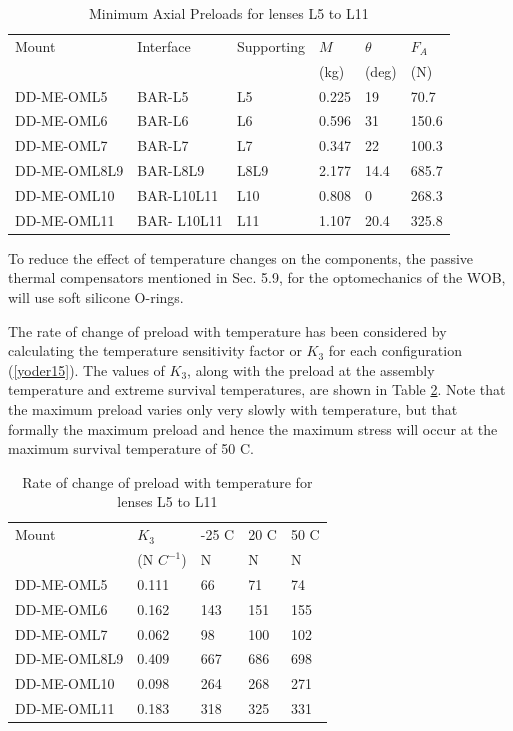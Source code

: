 \documentclass{report}
\begin{document}
\begin{table}
\caption{Minimum Axial Preloads for lenses L5 to L11}
\label{table:preloadsL5L11}
\begin{center}
\small
\begin{tabular}{llllll}
\hline
\hline
Mount	&	Interface	&	Supporting	&	$M$	&	$\theta$	&	$F_A$	\\
	&		&		&	(kg)	&	(deg)	&	(N)	\\
	\hline
DD-ME-OML5	&	BAR-L5	&	L5	&	0.225	&	19	&	70.7	\\
DD-ME-OML6	&	BAR-L6	&	L6	&	0.596	&	31	&	150.6	\\
DD-ME-OML7	&	BAR-L7	&	L7	&	0.347	&	22	&	100.3	\\
DD-ME-OML8L9	&	BAR-L8L9	&	L8L9	&	2.177	&	14.4	&	685.7	\\
DD-ME-OML10	&	BAR-L10L11	&	L10	&	0.808	&	0	&	268.3	\\
DD-ME-OML11	&	BAR- L10L11	&	L11	&	1.107	&	20.4	&	325.8	\\
\hline
\end{tabular}
\end{center}
\end{table}

To reduce the effect of temperature changes on the components, the passive thermal compensators mentioned in Sec. 5.9, for the optomechanics of the WOB, will use soft silicone O-rings.

The rate of change of preload with temperature has been considered by calculating the temperature sensitivity factor or $K_3$ for each configuration (\ref{yoder15}). The values of $K_3$, along with the preload at the assembly temperature and extreme survival temperatures, are shown in Table \ref{table:RateChange_preloadsL5L11}. Note that the maximum preload varies only very slowly with temperature, but that formally the maximum preload and hence the maximum stress will occur at the maximum survival temperature of 50 C.

\begin{table}
\caption{Rate of change of preload with temperature for lenses L5 to L11}
\label{table:RateChange_preloadsL5L11}
\begin{center}
\small
\begin{tabular}{lllll}
\hline
\hline
Mount	&	$K_3$	&	-25 C &	20 C &	50 C \\
	&	(N $C^{-1}$)	&	N	&	N	&	N	\\
	\hline
DD-ME-OML5	&	0.111	&	66	&	71	&	74	\\
DD-ME-OML6	&	0.162	&	143	&	151	&	155	\\
DD-ME-OML7	&	0.062	&	98	&	100	&	102	\\
DD-ME-OML8L9	&	0.409	&	667	&	686	&	698	\\
DD-ME-OML10	&	0.098	&	264	&	268	&	271	\\
DD-ME-OML11	&	0.183	&	318	&	325	&	331	\\
\hline
\end{tabular}
\end{center}
\end{table}
\end{document}
